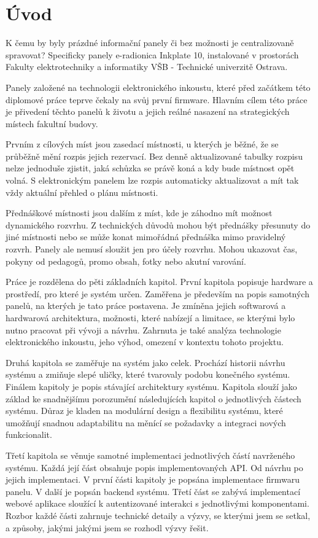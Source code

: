 \chapter{Úvod}

K čemu by byly prázdné informační panely či bez možnosti je centralizovaně spravovat? Specificky panely e-radionica Inkplate 10, instalované v prostorách Fakulty elektrotechniky a informatiky VŠB - Technické univerzitě Ostrava.

Panely založené na technologii elektronického inkoustu, které před začátkem této diplomové práce teprve čekaly na svůj první firmware. Hlavním cílem této práce je přivedení těchto panelů k životu a jejich reálné nasazení na strategických místech fakultní budovy.

Prvním z cílových míst jsou zasedací místnosti, u kterých je běžné, že se průběžně mění rozpis jejich rezervací. Bez denně aktualizované tabulky rozpisu nelze jednoduše zjistit, jaká schůzka se právě koná a kdy bude místnost opět volná. S elektronickým panelem lze rozpis automaticky aktualizovat a mít tak vždy aktuální přehled o plánu místnosti.

Přednáškové místnosti jsou dalším z míst, kde je záhodno mít možnost dynamického rozvrhu. Z technických důvodů mohou být přednášky přesunuty do jiné místnosti nebo se může konat mimořádná přednáška mimo pravidelný rozvrh. Panely ale nemusí sloužit jen pro účely rozvrhu. Mohou ukazovat čas, pokyny od pedagogů, promo obsah, fotky nebo akutní varování.

Práce je rozdělena do pěti základních kapitol. První kapitola popisuje hardware a prostředí, pro které je systém určen. Zaměřena je především na popis samotných panelů, na kterých je tato práce postavena. Je zmíněna jejich softwarová a hardwarová architektura, možnosti, které nabízejí a limitace, se kterými bylo nutno pracovat při vývoji a návrhu. Zahrnuta je také analýza technologie elektronického inkoustu, jeho výhod, omezení v kontextu tohoto projektu.

Druhá kapitola se zaměřuje na systém jako celek. Prochází historii návrhu systému a zmiňuje slepé uličky, které tvarovaly podobu konečného systému. Finálem kapitoly je popis stávající architektury systému. Kapitola slouží jako základ ke snadnějšímu porozumění následujících kapitol o jednotlivých částech systému. Důraz je kladen na modulární design a flexibilitu systému, které umožňují snadnou adaptabilitu na měnící se požadavky a integraci nových funkcionalit.

Třetí kapitola se věnuje samotné implementaci jednotlivých částí navrženého systému. Každá její část obsahuje popis implementovaných API. Od návrhu po jejich implementaci. V první části kapitoly je popsána implementace firmwaru panelu. V další je popsán backend systému. Třetí část se zabývá implementací webové aplikace sloužící k autentizované interakci s jednotlivými komponentami. Rozbor každé části zahrnuje technické detaily a výzvy, se kterými jsem se setkal, a způsoby, jakými jakými jsem se rozhodl výzvy řešit.

